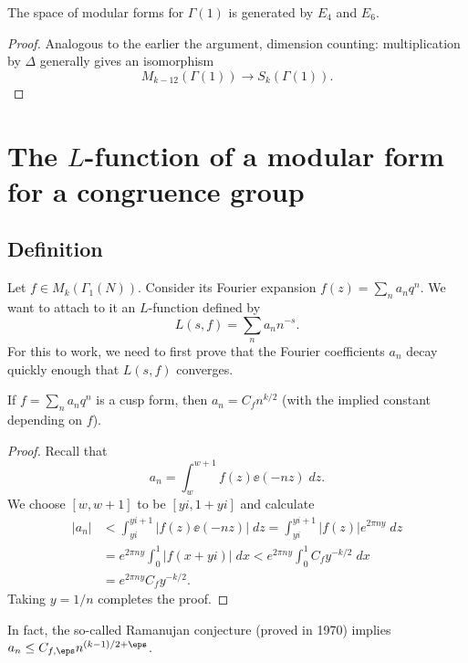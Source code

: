 \begin{theorem}
  The space of modular forms for $\Gamma(1)$
  is generated by $E_4$ and $E_6$.
\end{theorem}
\begin{proof}
  Analogous to the earlier the argument, dimension counting:
  multiplication by $\Delta$ generally gives an isomorphism
  \[ M_{k-12}(\Gamma(1)) \to S_{k}(\Gamma(1)). \]
\end{proof}


\section{The $L$-function of a modular form for a congruence group}
\subsection{Definition}
Let $f \in M_k(\Gamma_1(N))$.
Consider its Fourier expansion $f(z) = \sum_n a_n q^{n}$.
We want to attach to it an $L$-function defined by
\[ L(s,f) = \sum_n a_n n^{-s}. \]
For this to work, we need to first prove that
the Fourier coefficients $a_n$ decay quickly enough that
$L(s,f)$ converges.

\begin{lemma}
  If $f = \sum_n a_n q^{n}$ is a cusp form, then $a_n = C_f n^{k/2}$
  (with the implied constant depending on $f$).
\end{lemma}
\begin{proof}
  Recall that
  \[ a_n = \int_w^{w+1} f(z) \ee(-nz) \; dz. \]
  We choose $[w,w+1]$ to be $[yi, 1+yi]$ and calculate
  \begin{align*}
    \left\lvert a_n \right\rvert
    &< \int_{yi}^{yi+1} \left\lvert f(z) \ee(-nz) \right\rvert \; dz
    = \int_{yi}^{yi+1} \left\lvert f(z) \right\rvert e^{2\pi n y} \; dz \\
    &= e^{2\pi n y} \int_0^1 \left\lvert f(x+yi) \right\rvert \; dx
    < e^{2\pi n y} \int_0^1 C_f y^{-k/2} \; dx \\
    &= e^{2\pi n y} C_f y^{-k/2}.
  \end{align*}
  Taking $y=1/n$ completes the proof.
\end{proof}
\begin{remark}
  In fact, the so-called Ramanujan conjecture (proved in 1970)
  implies $a_n \le C_{f,\eps} n^{(k-1)/2+\eps}$.
\end{remark}

